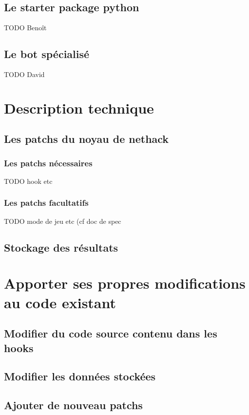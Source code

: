 \documentclass[10pt,a4paper]{report}
\begin{document}
\section{Le starter package python}
TODO Benoît

\section{Le bot spécialisé}
TODO David

\chapter{Description technique}
\section{Les patchs du noyau de nethack}

\subsection{Les patchs nécessaires}
TODO hook etc

\subsection{Les patchs facultatifs}
TODO mode de jeu etc (cf doc de spec

\section{Stockage des résultats}

\chapter{Apporter ses propres modifications au code existant}
\section{Modifier du code source contenu dans les hooks}

\section{Modifier les données stockées}

\section{Ajouter de nouveau patchs}
\end{document}

